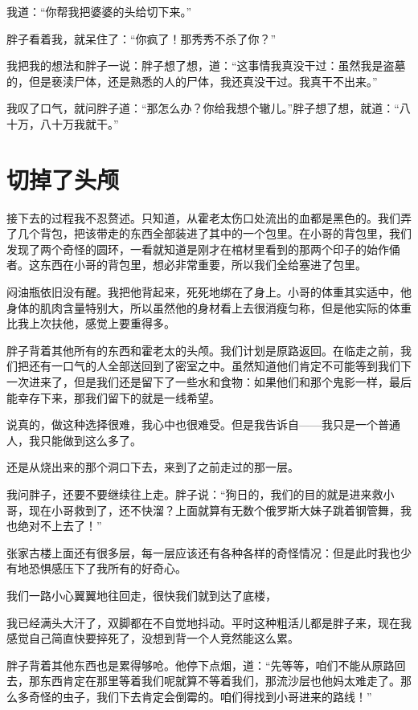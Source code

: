 我道：“你帮我把婆婆的头给切下来。”

胖子看着我，就呆住了：“你疯了！那秀秀不杀了你？”

我把我的想法和胖子一说：胖子想了想，道：“这事情我真没干过：虽然我是盗墓的，但是亵渎尸体，还是熟悉的人的尸体，我还真没干过。我真干不出来。”

我叹了口气，就问胖子道：“那怎么办？你给我想个辙儿。”胖子想了想，就道：“八十万，八十万我就干。”

\chapter{切掉了头颅}

接下去的过程我不忍赘述。只知道，从霍老太伤口处流出的血都是黑色的。我们弄了几个背包，把该带走的东西全部装进了其中的一个包里。在小哥的背包里，我们发现了两个奇怪的圆环，一看就知道是刚才在棺材里看到的那两个印子的始作俑者。这东西在小哥的背包里，想必非常重要，所以我们全给塞进了包里。

闷油瓶依旧没有醒。我把他背起来，死死地绑在了身上。小哥的体重其实适中，他身体的肌肉含量特别大，所以虽然他的身材看上去很消瘦匀称，但是他实际的体重比我上次扶他，感觉上要重得多。

胖子背着其他所有的东西和霍老太的头颅。我们计划是原路返回。在临走之前，我们把还有一口气的人全部送回到了密室之中。虽然知道他们肯定不可能等到我们下一次进来了，但是我们还是留下了一些水和食物：如果他们和那个鬼影一样，最后能幸存下来，那我们留下的就是一线希望。

说真的，做这种选择很难，我心中也很难受。但是我告诉自——我只是一个普通人，我只能做到这么多了。

还是从烧出来的那个洞口下去，来到了之前走过的那一层。

我问胖子，还要不要继续往上走。胖子说：“狗日的，我们的目的就是进来救小哥，现在小哥救到了，还不快溜？上面就算有无数个俄罗斯大妹子跳着钢管舞，我也绝对不上去了！”

张家古楼上面还有很多层，每一层应该还有各种各样的奇怪情况：但是此时我也少有地恐惧感压下了我所有的好奇心。

我们一路小心翼翼地往回走，很快我们就到达了底楼，

我已经满头大汗了，双脚都在不自觉地抖动。平时这种粗活儿都是胖子来，现在我感觉自己简直快要捽死了，没想到背一个人竞然能这么累。

胖子背着其他东西也是累得够呛。他停下点烟，道：“先等等，咱们不能从原路回去，那东西肯定在那里等着我们呢就算不等着我们，那流沙层也他妈太难走了。那么多奇怪的虫子，我们下去肯定会倒霉的。咱们得找到小哥进来的路线！”

